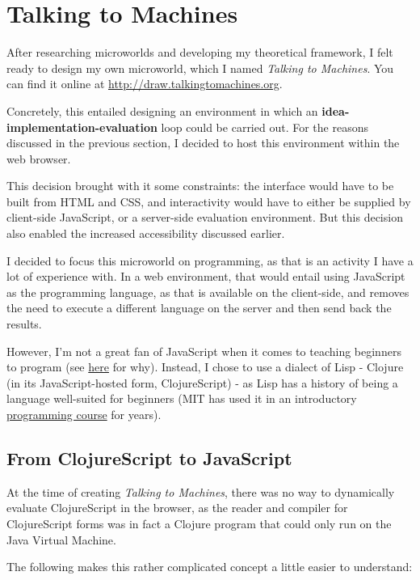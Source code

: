 \section{Talking to Machines}

After researching microworlds and developing my theoretical framework, I
felt ready to design my own microworld, which I named \emph{Talking to
Machines}. You can find it online at \url{http://draw.talkingtomachines.org}.

Concretely, this entailed designing an environment in which an
\textbf{idea-implementation-evaluation} loop could be carried out. For the
reasons discussed in the previous section, I decided to host this
environment within the web browser.

This decision brought with it some constraints: the interface would have
to be built from HTML and CSS, and interactivity would have to either be
supplied by client-side JavaScript, or a server-side evaluation
environment. But this decision also enabled the increased accessibility
discussed earlier.

I decided to focus this microworld on programming, as that is an
activity I have a lot of experience with. In a web environment, that
would entail using JavaScript as the programming language, as that is
available on the client-side, and removes the need to execute a
different language on the server and then send back the results.

However, I'm not a great fan of JavaScript when it comes to teaching
beginners to program (see \href{https://www.destroyallsoftware.com/talks/wat}{here} for why). Instead, I chose to use
a dialect of Lisp - Clojure (in its JavaScript-hosted form,
ClojureScript) - as Lisp has a history of being a language well-suited
for beginners (MIT has used it in an introductory \href{http://mitpress.mit.edu/sicp/course.html}{programming course} for years).

\subsection{From ClojureScript to JavaScript}

At the time of creating \emph{Talking to Machines}, there was no way to
dynamically evaluate ClojureScript in the browser, as the reader and
compiler for ClojureScript forms was in fact a Clojure program that
could only run on the Java Virtual Machine.

The following makes this rather complicated concept a little easier to
understand:

